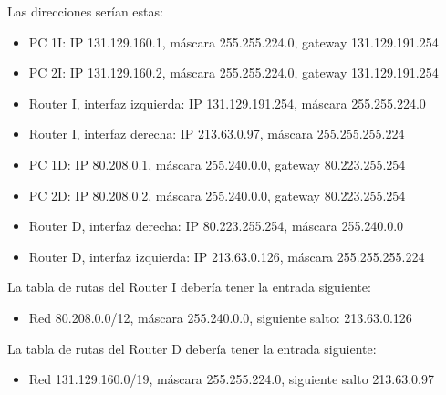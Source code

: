 \documentclass[letterpaper,10pt,spanish]{sphinxmanual}
\begin{document}
\sphinxAtStartPar
Las direcciones serían estas:
\begin{itemize}
\item {} 
\sphinxAtStartPar
PC 1I: IP 131.129.160.1, máscara 255.255.224.0, gateway 131.129.191.254

\item {} 
\sphinxAtStartPar
PC 2I: IP 131.129.160.2, máscara 255.255.224.0, gateway 131.129.191.254

\item {} 
\sphinxAtStartPar
Router I, interfaz izquierda: IP 131.129.191.254, máscara 255.255.224.0

\item {} 
\sphinxAtStartPar
Router I, interfaz derecha: IP 213.63.0.97, máscara 255.255.255.224

\item {} 
\sphinxAtStartPar
PC 1D: IP 80.208.0.1, máscara 255.240.0.0, gateway 80.223.255.254

\item {} 
\sphinxAtStartPar
PC 2D: IP 80.208.0.2, máscara 255.240.0.0, gateway 80.223.255.254

\item {} 
\sphinxAtStartPar
Router D, interfaz derecha: IP 80.223.255.254, máscara 255.240.0.0

\item {} 
\sphinxAtStartPar
Router D, interfaz izquierda: IP 213.63.0.126, máscara 255.255.255.224

\end{itemize}

\sphinxAtStartPar
La tabla de rutas del Router I debería tener la entrada siguiente:
\begin{itemize}
\item {} 
\sphinxAtStartPar
Red 80.208.0.0/12, máscara 255.240.0.0, siguiente salto: 213.63.0.126

\end{itemize}

\sphinxAtStartPar
La tabla de rutas del Router D debería tener la entrada siguiente:
\begin{itemize}
\item {} 
\sphinxAtStartPar
Red 131.129.160.0/19, máscara 255.255.224.0, siguiente salto 213.63.0.97

\end{itemize}
\end{document}
